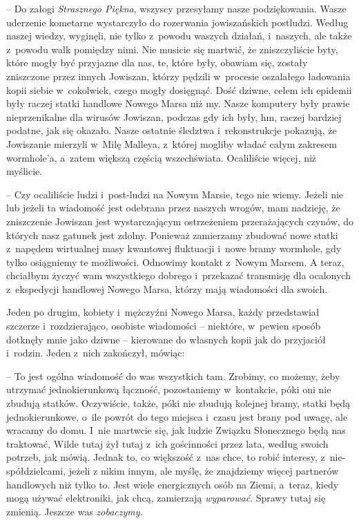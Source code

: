 \documentclass[oneside,polish,11pt,sfheadings]{mwbk}
\begin{document}
-- Do załogi \textit{Strasznego Piękna}, wszyscy przesyłamy nasze
podziękowania. Wasze uderzenie kometarne wystarczyło do rozerwania
jowiszańskich postludzi. Według naszej wiedzy, wyginęli, nie tylko z~powodu waszych działań, i~naszych, ale także z~powodu walk pomiędzy
nimi. Nie musicie się martwić, że zniszczyliście byty, które mogły być
przyjazne dla nas, te, które były, obawiam się, zostały zniszczone przez
innych Jowiszan, którzy pędzili w~procesie oszalałego ładowania kopii
siebie w~cokolwiek, czego mogły dosięgnąć. Dość dziwne, celem ich
epidemii były raczej statki handlowe Nowego Marsa niż my. Nasze
komputery były prawie nieprzenikalne dla wirusów Jowiszan, podczas gdy
ich były, hm, raczej bardziej podatne, jak się okazało. Nasze ostatnie
śledztwa i~rekonstrukcje pokazują, że Jowiszanie mierzyli w~Milę
Malleya, z~której mogliby władać całym zakresem wormhole'a, a~zatem
większą częścią wszechświata. Ocaliliście więcej, niż myślicie.

-- Czy ocaliliście ludzi i~post-ludzi na Nowym Marsie, tego nie wiemy.
Jeżeli nie lub jeżeli ta wiadomość jest odebrana przez naszych wrogów,
mam nadzieję, że zniszczenie Jowiszan jest wystarczającym ostrzeżeniem
przerażających czynów, do których nasz gatunek jest zdolny. Ponieważ
zamierzamy zbudować nowe statki z~napędem wirtualnej masy kwantowej
fluktuacji i~nowe bramy wormhole, gdy tylko osiągniemy te możliwości.
Odnowimy kontakt z~Nowym Marsem. A teraz, chciałbym życzyć wam
wszystkiego dobrego i~przekazać transmisję dla ocalonych z~ekspedycji
handlowej Nowego Marsa, którzy mają wiadomości dla swoich.

Jeden po drugim, kobiety i~mężczyźni Nowego Marsa, każdy przedstawiał
szczerze i~rozdzierająco, osobiste wiadomości -- niektóre, w~pewien
sposób dotknęły mnie jako dziwne -- kierowane do własnych kopii jak do
przyjaciół i~rodzin. Jeden z~nich zakończył, mówiąc:

-- To jest ogólna wiadomość do was wszystkich tam. Zrobimy, co możemy,
żeby utrzymać jednokierunkową łączność, pozostaniemy w~kontakcie, póki
oni nie zbudują statków. Oczywiście, także, póki nie zbudują kolejnej
bramy, statki będą jednokierunkowe, o~ile powrót do tego miejsca i~czasu
jest brany pod uwagę, ale wracamy do domu. I~nie martwcie się, jak
ludzie Związku Słonecznego będą nas traktować, Wilde tutaj żył tutaj z~ich gościnności przez lata, według swoich potrzeb, jak mówią. Jednak to,
co większość z~nas chce, to robić interesy, z~nie-spółdzielcami, jeżeli
z nikim innym, ale myślę, że znajdziemy więcej partnerów handlowych niż
tylko to. Jest wiele energicznych osób na Ziemi, a~teraz, kiedy mogą
używać elektroniki, jak chcą, zamierzają \textit{wyparować}. Sprawy tutaj
się zmienią. Jeszcze was \textit{zobaczymy}.
\end{document}
